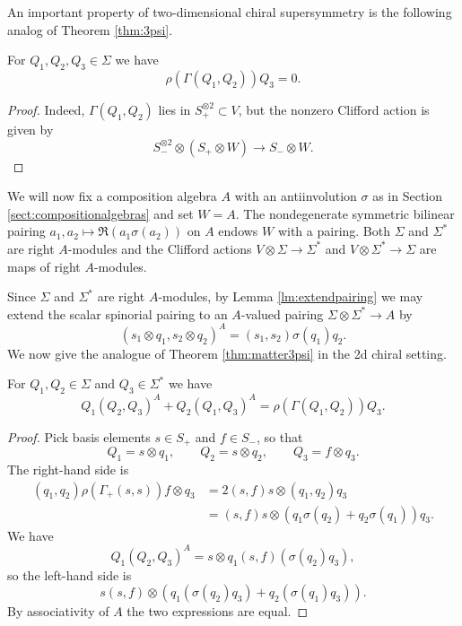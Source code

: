 \documentclass[10pt, oneside]{article}
\begin{document}
An important property of two-dimensional chiral supersymmetry is the following analog of Theorem \ref{thm:3psi}.

\begin{theorem}
For $Q_1, Q_2, Q_3\in\Sigma$ we have
\[\rho(\Gamma(Q_1, Q_2))Q_3 = 0.\]
\label{thm:2d3psi}
\end{theorem}
\begin{proof}
Indeed, $\Gamma(Q_1, Q_2)$ lies in $S_+^{\otimes 2}\subset V$, but the nonzero Clifford action is given by
\[S_-^{\otimes 2}\otimes (S_+\otimes W)\longrightarrow S_-\otimes W.\]
\end{proof}

We will now fix a composition algebra $A$ with an antiinvolution $\sigma$ as in Section \ref{sect:compositionalgebras} and set $W = A$. The nondegenerate symmetric bilinear pairing $a_1, a_2\mapsto \Re(a_1\sigma(a_2))$ on $A$ endows $W$ with a pairing. Both $\Sigma$ and $\Sigma^*$ are right $A$-modules and the Clifford actions $V\otimes \Sigma\rightarrow \Sigma^*$ and $V\otimes \Sigma^*\rightarrow \Sigma$ are maps of right $A$-modules.

Since $\Sigma$ and $\Sigma^*$ are right $A$-modules, by Lemma \ref{lm:extendpairing} we may extend the scalar spinorial pairing to an $A$-valued pairing $\Sigma\otimes \Sigma^*\rightarrow A$ by
\[(s_1\otimes q_1, s_2\otimes q_2)^A = (s_1, s_2)\sigma(q_1) q_2.\]
We now give the analogue of Theorem \ref{thm:matter3psi} in the 2d chiral setting.

\begin{theorem}
For $Q_1, Q_2\in\Sigma$ and $Q_3\in\Sigma^*$ we have
\[Q_1(Q_2, Q_3)^A + Q_2(Q_1, Q_3)^A = \rho(\Gamma(Q_1, Q_2))Q_3.\]
\label{thm:2dmatter3psi}
\end{theorem}
\begin{proof}
Pick basis elements $s\in S_+$ and $f\in S_-$, so that
\[Q_1 = s\otimes q_1,\qquad Q_2 = s\otimes q_2,\qquad Q_3 = f\otimes q_3.\]
The right-hand side is
\begin{align*}
(q_1, q_2) \rho(\Gamma_+(s, s)) f\otimes q_3 &= 2(s, f) s\otimes (q_1, q_2) q_3 \\
&= (s, f) s\otimes (q_1\sigma(q_2) + q_2\sigma(q_1)) q_3.
\end{align*}
We have
\[Q_1(Q_2, Q_3)^A = s\otimes q_1 (s, f) (\sigma(q_2)q_3),\]
so the left-hand side is
\[s(s, f)\otimes (q_1(\sigma(q_2) q_3) + q_2(\sigma(q_1)q_3)).\]
By associativity of $A$ the two expressions are equal.
\end{proof}
\end{document}
